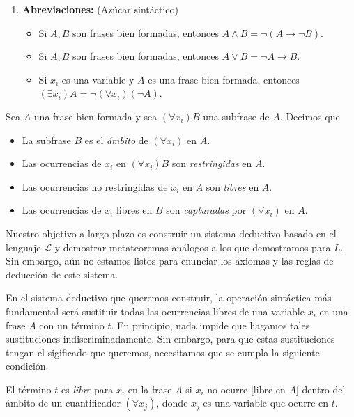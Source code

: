 \begin{definition}
\begin{enumerate}
    \item \textbf{Abreviaciones:} (Azúcar sintáctico)
    \begin{itemize}
        \item Si $A,B$ son frases bien formadas, entonces $A \wedge B = \neg (A \to \neg B)$.
        \item Si $A,B$ son frases bien formadas, entonces $A \vee B = \neg A \to B$.
        \item Si $x_i$ es una variable y $A$ es una frase bien formada, entonces $(\exists x_i) A = \neg (\forall x_i) (\neg A)$.
    \end{itemize}
\end{enumerate}
\end{definition}

\begin{definition}
Sea $A$ una frase bien formada y sea $(\forall x_i) B$ una subfrase de $A$. Decimos que
\begin{itemize}
    \item La subfrase $B$ es el \textit{ámbito} de $(\forall x_i)$ en $A$.
    \item Las ocurrencias de $x_i$ en $(\forall x_i) B$ son \textit{restringidas} en $A$.
    \item Las ocurrencias no restringidas de $x_i$ en $A$ son \textit{libres} en $A$.
    \item Las ocurrencias de $x_i$ libres en $B$ son \textit{capturadas} por $(\forall x_i)$ en $A$.
\end{itemize}
\end{definition}

\begin{motivation}
Nuestro objetivo a largo plazo es construir un sistema deductivo basado en el lenguaje $\mathscr L$ y demostrar metateoremas análogos a los que demostramos para $L$. Sin embargo, aún no estamos listos para enunciar los axiomas y las reglas de deducción de este sistema.

En el sistema deductivo que queremos construir, la operación sintáctica más fundamental será sustituir todas las ocurrencias libres de una variable $x_i$ en una frase $A$ con un término $t$. En principio, nada impide que hagamos tales sustituciones indiscriminadamente. Sin embargo, para que estas sustituciones tengan el sigificado que queremos, necesitamos que se cumpla la siguiente condición.
\end{motivation}

\begin{definition}
El término $t$ es \textit{libre} para $x_i$ en la frase $A$ si $x_i$ no ocurre [libre en $A$] dentro del ámbito de un cuantificador $(\forall x_j)$, donde $x_j$ es una variable que ocurre en $t$.
\end{definition}

